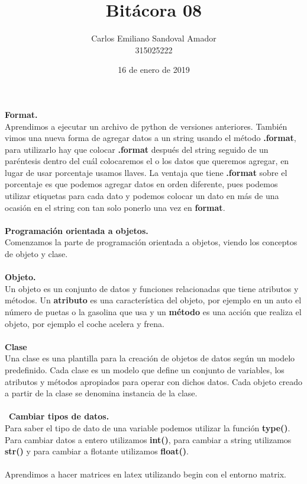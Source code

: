 \documentclass[letterpaper, 12pt, oneside]{article}
\title{Bitácora 08}
\author{Carlos Emiliano Sandoval Amador \\ 315025222}
\date{16 de enero de 2019}
\begin{document}
	\maketitle
	\textbf{\Large Format.} \\
	Aprendimos a ejecutar un archivo de python de versiones anteriores. También vimos una nueva forma de agregar datos a un string usando el método \textbf{.format}, para utilizarlo hay que colocar \textbf{.format} después del string seguido de un paréntesis dentro del cuál colocaremos el o los datos que queremos agregar, en lugar de usar porcentaje usamos llaves. La ventaja que tiene \textbf{.format} sobre el porcentaje es que podemos agregar datos en orden diferente, pues podemos utilizar etiquetas para cada dato y podemos colocar un dato en más de una ocasión en el string con tan solo ponerlo una vez en \textbf{format}.\\ \\ \textbf{\Large Programación orientada a objetos.} \\
	Comenzamos la parte de programación orientada a objetos, viendo los conceptos de objeto y clase.\\ \\ \textbf{Objeto.} \\ Un objeto es un conjunto de datos y funciones relacionadas que tiene atributos y métodos. Un \textbf{atributo} es una característica del objeto, por ejemplo en un auto el número de puetas o la gasolina que usa y un \textbf{método} es una acción que realiza el objeto, por ejemplo el coche acelera y frena. \\ \\ \textbf{Clase} \\ Una clase es una plantilla para la creación de objetos de datos según un modelo predefinido. Cada clase es un modelo que define un conjunto de variables, los atributos y métodos apropiados para operar con dichos datos. Cada objeto creado a partir de la clase se denomina instancia de la clase. \\ \\ \textbf{\Large Cambiar tipos de datos.} \\ Para saber el tipo de dato de una variable podemos utilizar la función \textbf{type()}. Para cambiar datos a entero utilizamos \textbf{int()}, para cambiar a string utilizamos \textbf{str()} y para cambiar a flotante utilizamos \textbf{float()}. \\ \\
	Aprendimos a hacer matrices en latex utilizando begin con el entorno matrix.
	
\end{document}
